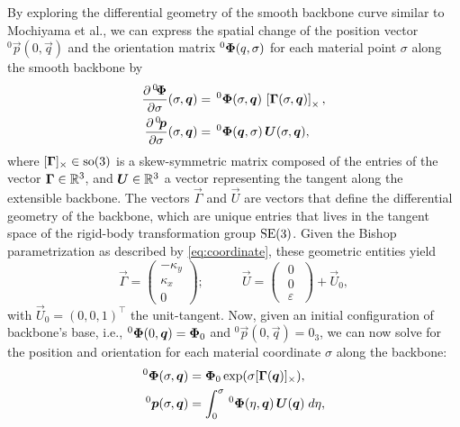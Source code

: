 {By exploring the differential geometry of the smooth backbone curve similar to Mochiyama et al.\cite{Mochiyama2003}, we can express the spatial change of the position vector $^0 \vec{p}(0,\vec{q})$ and the orientation matrix $^0\boldsymbol{\Phi}(q,\sigma)$ for each material point $\sigma$ along the smooth backbone by
%
\begin{align}
\renewcommand*{\arraystretch}{2}{}
\frac{\partial \,^0\!\mat{\Phi}}{\partial \sigma}(\sigma,\vec{q}) & = \, ^0\mat{\Phi}(\sigma,\vec{q})\,\left[\mat{\Gamma} (\sigma,\vec{q}) \right]_{\times}, \label{eq:change_phi} \\
\frac{\partial \,^0\! \vec{p}}{\partial \sigma}(\sigma,\vec{q}) & = \, ^0\mat{\Phi}(\vec{q},\sigma) \, \vec{U}(\sigma,\vec{q}), \label{eq:change_p}
\end{align}
%
where $[\boldsymbol{\Gamma}]_\times \in {\text{so}(3)}$ is a skew-symmetric matrix composed of the entries of the vector $\boldsymbol{\Gamma} \in \mathbb{R}^3$, and $\boldsymbol{U}\in \mathbb{R}^3$ a vector representing the tangent along the extensible backbone. The vectors $\vec{\Gamma}$ and $\vec{U}$ are vectors that define the differential geometry of the backbone, which are unique entries that lives in the tangent space of the rigid-body transformation group ${\text{SE}(3)}$. Given the Bishop parametrization as described by \eqref{eq:coordinate}, these geometric entities yield
%
\begin{equation}
\vec{\Gamma} = \begin{pmatrix} -\kappa_y \\ \kappa_x \\ 0  \end{pmatrix}; \quad \quad \quad \vec{U} = \begin{pmatrix} \,\, 0 \,\, \\ \,\, 0 \,\, \\ \, \,\varepsilon \,\, \end{pmatrix} + \vec{U}_0,
\end{equation}
%
with $\vec{U}_0 = (0,0,1)^\top$ the unit-tangent. Now, given an initial configuration of backbone's base, i.e., $^0 \boldsymbol{\Phi}(0,\boldsymbol{q}) = \boldsymbol{\Phi}_0$ and $^0 \vec{p}(0,\vec{q}) = 0_3$, we can now solve for the position and orientation for each material coordinate $\sigma$ along the backbone:
%
\begin{align}
^0\mat{\Phi}(\sigma,\vec{q}) & = \vec{\Phi}_0\exp(\sigma [\vec{\Gamma}(\vec{q})]_\times), \label{eq:phi_exact} \\
^0\vec{p}(\sigma,\vec{q}) & = \int_0^\sigma\,^0\mat{\Phi}(\eta,\vec{q})\, \vec{U}(\vec{q}) \; d\eta, \label{eq:pos_vector}

\end{align}}
